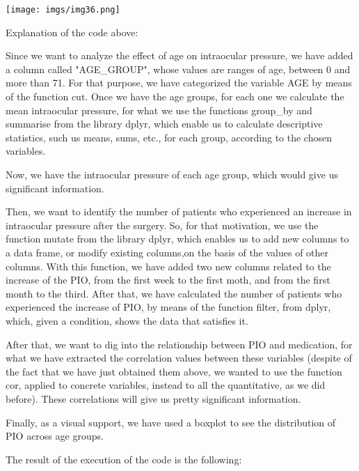 \documentclass{article}
\begin{document}
\hspace{1cm}

\begin{center}
    {\texttt{[image: imgs/img36.png]}\par}
\end{center}

\hspace{1cm}

Explanation of the code above:

Since we want to analyze the effect of age on intraocular pressure, we have added a column called
"AGE\_GROUP", whose values are ranges of age, between 0 and more than 71. For that purpose, we have categorized 
the variable AGE by means of the function cut. Once we have the age groups, for each one we calculate the 
mean intraocular pressure, for what we use the functions group\_by and summarise from the library dplyr, which enable us to 
calculate descriptive statistics, such us means, sums, etc., for each group, according to the chosen variables.

Now, we have the intraocular pressure of each age group, which would give us significant information.

Then, we want to identify the number of patients who experienced an increase in intraocular pressure after the
surgery. So, for that motivation, we use the function mutate from the library dplyr, which enables us to add new columns to 
a data frame, or modify existing columns,on the basis of the values of other columns. With this function, we have added two new columns
related to the increase of the PIO, from the first week to the first moth, and from the first month to the third.
After that, we have calculated the number of patients who experienced the increase of PIO, by means of the function filter, from 
dplyr, which, given a condition, shows the data that satisfies it.

After that, we want to dig into the relationship between PIO and medication, for what we have extracted the correlation
values between these variables (despite of the fact that we have just obtained them above, we wanted to use the function cor, applied to 
concrete variables, instead to all the quantitative, as we did before). These correlations will give us pretty significant information.

Finally, as a visual support, we have used a boxplot to see the distribution of PIO across age groups.

The result of the execution of the code is the following:
\end{document}
